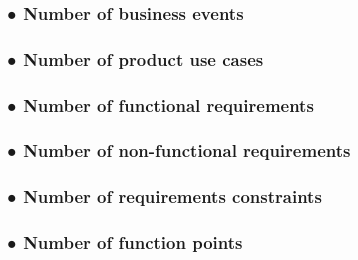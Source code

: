 \documentclass[
]{article}
\begin{document}
\hypertarget{number-of-business-events}{%
\subsubsection{● Number of business
events}\label{number-of-business-events}}

\hypertarget{number-of-product-use-cases}{%
\subsubsection{● Number of product use
cases}\label{number-of-product-use-cases}}

\hypertarget{number-of-functional-requirements}{%
\subsubsection{● Number of functional
requirements}\label{number-of-functional-requirements}}

\hypertarget{number-of-non-functional-requirements}{%
\subsubsection{● Number of non-functional
requirements}\label{number-of-non-functional-requirements}}

\hypertarget{number-of-requirements-constraints}{%
\subsubsection{● Number of requirements
constraints}\label{number-of-requirements-constraints}}

\hypertarget{number-of-function-points}{%
\subsubsection{● Number of function
points}\label{number-of-function-points}}
\end{document}
